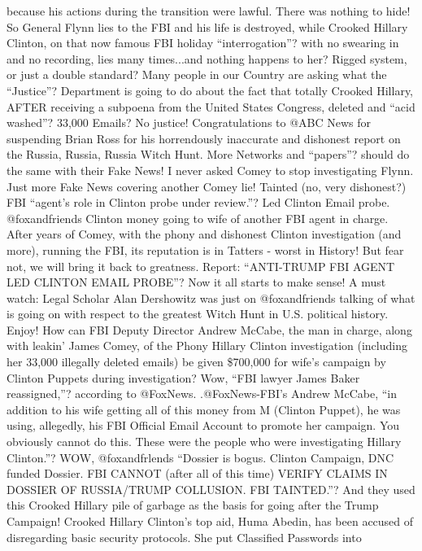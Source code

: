 because his actions during the transition were lawful. There was nothing
to hide! So General Flynn lies to the FBI and his life is destroyed,
while Crooked Hillary Clinton, on that now famous FBI holiday
``interrogation''? with no swearing in and no recording, lies many
times...and nothing happens to her? Rigged system, or just a double
standard? Many people in our Country are asking what the ``Justice''?
Department is going to do about the fact that totally Crooked Hillary,
AFTER receiving a subpoena from the United States Congress, deleted and
``acid washed''? 33,000 Emails? No justice! Congratulations to @ABC News
for suspending Brian Ross for his horrendously inaccurate and dishonest
report on the Russia, Russia, Russia Witch Hunt. More Networks and
``papers''? should do the same with their Fake News! I never asked Comey
to stop investigating Flynn. Just more Fake News covering another Comey
lie! Tainted (no, very dishonest?) FBI ``agent's role in Clinton probe
under review.''? Led Clinton Email probe. @foxandfriends Clinton money
going to wife of another FBI agent in charge. After years of Comey, with
the phony and dishonest Clinton investigation (and more), running the
FBI, its reputation is in Tatters - worst in History! But fear not, we
will bring it back to greatness. Report: ``ANTI-TRUMP FBI AGENT LED
CLINTON EMAIL PROBE''? Now it all starts to make sense! A must watch:
Legal Scholar Alan Dershowitz was just on @foxandfriends talking of what
is going on with respect to the greatest Witch Hunt in U.S. political
history. Enjoy! How can FBI Deputy Director Andrew McCabe, the man in
charge, along with leakin' James Comey, of the Phony Hillary Clinton
investigation (including her 33,000 illegally deleted emails) be given
\$700,000 for wife's campaign by Clinton Puppets during investigation?
Wow, ``FBI lawyer James Baker reassigned,''? according to @FoxNews.
.@FoxNews-FBI's Andrew McCabe, ``in addition to his wife getting all of
this money from M (Clinton Puppet), he was using, allegedly, his FBI
Official Email Account to promote her campaign. You obviously cannot do
this. These were the people who were investigating Hillary Clinton.''?
WOW, @foxandfrlends ``Dossier is bogus. Clinton Campaign, DNC funded
Dossier. FBI CANNOT (after all of this time) VERIFY CLAIMS IN DOSSIER OF
RUSSIA/TRUMP COLLUSION. FBI TAINTED.''? And they used this Crooked
Hillary pile of garbage as the basis for going after the Trump Campaign!
Crooked Hillary Clinton's top aid, Huma Abedin, has been accused of
disregarding basic security protocols. She put Classified Passwords into
